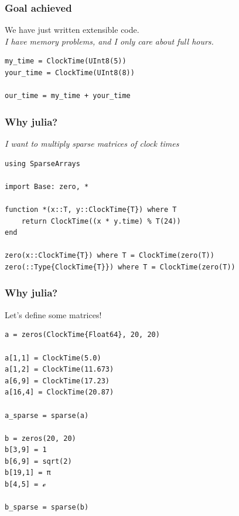 \documentclass{beamer}
\begin{document}
    \begin{frame}[fragile]
        \frametitle{Goal achieved}
        We have just written extensible code.\\
        \vspace{0.5cm}
        \textit{I have memory problems, and I only care about full hours.}
        \vspace{0.5cm}
        \begin{lstlisting}[language=JuliaLocal, style=julia]
my_time = ClockTime(UInt8(5))
your_time = ClockTime(UInt8(8))

our_time = my_time + your_time\end{lstlisting}
    \end{frame}

        \begin{frame}[fragile]
        \frametitle{Why julia?}
        \textit{I want to multiply sparse matrices of clock times}
        \vspace{0.5cm}
        \begin{lstlisting}[language=JuliaLocal, style=julia, basicstyle=\scriptsize\JuliaMonoRegular]
using SparseArrays

import Base: zero, *

function *(x::T, y::ClockTime{T}) where T
    return ClockTime((x * y.time) % T(24))
end

zero(x::ClockTime{T}) where T = ClockTime(zero(T))
zero(::Type{ClockTime{T}}) where T = ClockTime(zero(T))
\end{lstlisting}
    \end{frame}

        \begin{frame}[fragile]
        \frametitle{Why julia?}
        Let's define some matrices!
        \begin{lstlisting}[language=JuliaLocal, style=julia, basicstyle=\scriptsize\JuliaMonoRegular]
a = zeros(ClockTime{Float64}, 20, 20)

a[1,1] = ClockTime(5.0)
a[1,2] = ClockTime(11.673)
a[6,9] = ClockTime(17.23)
a[16,4] = ClockTime(20.87)

a_sparse = sparse(a)

b = zeros(20, 20)
b[3,9] = 1
b[6,9] = sqrt(2)
b[19,1] = π
b[4,5] = ℯ

b_sparse = sparse(b)
\end{lstlisting}
    \end{frame}
\end{document}
